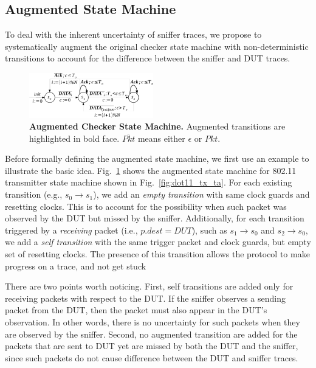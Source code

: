 \subsection{Augmented State Machine}
\label{subsec:augment}

To deal with the inherent uncertainty of sniffer traces, we propose to
systematically augment the original checker state machine with non-deterministic
transitions to account for the difference between the sniffer and DUT traces.


\begin{figure}
  \vspace*{-5mm}
  \centering
  \includegraphics[width=0.48\textwidth]{./figures/dot11_tx_checker.pdf}
  \caption{\textbf{Augmented Checker State Machine.} Augmented transitions are
  highlighted in bold face. $\overline{Pkt}$ means either $\epsilon$ or $Pkt$.}
  \label{fig:augment}
  \vspace*{-8mm}
\end{figure}


Before formally defining the augmented state machine, we first use an example to
illustrate the basic idea.
%
Fig.~\ref{fig:augment} shows the augmented state machine
for 802.11 transmitter state machine shown in Fig.~\ref{fig:dot11_tx_ta}.
%
For each existing transition (e.g., $s_0\rightarrow s_1$), we add an \textit{empty
transition} with same clock guards and resetting
clocks.
%
This is to account for the possibility when such packet was observed by
the DUT but missed by the sniffer.
%
Additionally, for each transition triggered
by a \textit{receiving} packet (i.e., $p.dest = DUT$), such as $s_1\rightarrow
s_0$ and $s_2\rightarrow s_0$, we add a \textit{self transition} with the same
trigger packet and clock guards, but empty set of resetting clocks.
%
The presence of this transition allows the protocol to make progress on a trace,
and not get stuck

There are two points worth noticing.
%
First, self transitions are added only for
receiving packets with respect to the DUT.
%
If the sniffer observes a sending packet from the DUT, then the packet must
also appear in the DUT's observation.
%
In other words, there is no uncertainty for such packets when they
are observed by the sniffer.
%
Second, no augmented transition are added for the packets that are sent to DUT yet
are missed by both the DUT and the sniffer, since such packets do not cause
difference between the DUT and sniffer traces.

